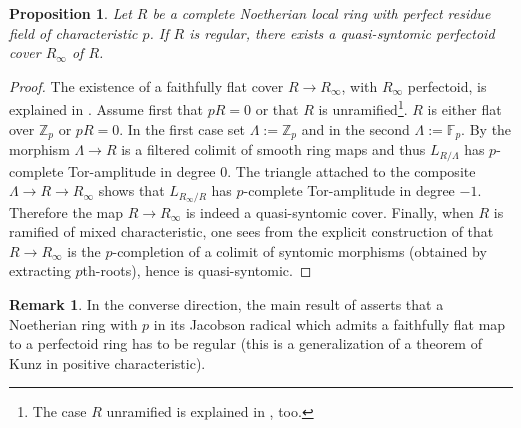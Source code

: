 \documentclass{amsart}
\theoremstyle{plain}
\newtheorem{proposition}[theorem]{Proposition}
\theoremstyle{definition}
\newtheorem{remark}[theorem]{Remark}
\newcommand{\F}{\mathbb{F}}
\newcommand{\Z}{\mathbb{Z}}
\newcommand{\blue}[1]{{\color{black}#1}}
\begin{document}
\begin{proposition}
\label{sec:comp-regular-perfectoid-cover}
Let $R$ be a \blue{complete Noetherian local ring with perfect residue field of characteristic $p$}. If $R$ is regular, there exists a quasi-syntomic perfectoid cover $R_{\infty}$ of $R$. 
\end{proposition}
\begin{proof}
  The existence of a faithfully flat cover $R \to R_{\infty}$, with $R_{\infty}$ perfectoid, is explained in \cite[Theorem 4.7]{bhatt_iyengar_ma_regular_rings_and_perfectoid_algebras}. Assume first that $pR=0$ or that $R$ is unramified\footnote{The case $R$ unramified is explained in \cite[Ex. 3.8 (4)]{bhatt_iyengar_ma_regular_rings_and_perfectoid_algebras}, too.}.  $R$ is either flat over $\Z_p$ or $pR=0$. In the first case set $\Lambda:=\Z_p$ and in the second $\Lambda:=\F_p$. By \cite[Tag 07GB]{stacks_project} the morphism $\Lambda\to R$ is a filtered colimit of smooth ring maps and thus $L_{R/\Lambda}$ has $p$-complete Tor-amplitude in degree $0$. The triangle attached to the composite $\Lambda \to R \to R_{\infty}$ shows that $L_{R_{\infty}/R}$ has $p$-complete Tor-amplitude in degree $-1$. Therefore the map $R \to R_{\infty}$ is indeed a quasi-syntomic cover. Finally, when $R$ is ramified of mixed characteristic, one sees from the explicit construction of \cite[Ex. 3.8 (5)]{bhatt_iyengar_ma_regular_rings_and_perfectoid_algebras} that $R \to R_{\infty}$ is the $p$-completion of a colimit of syntomic morphisms (obtained by extracting $p$th-roots), hence is quasi-syntomic. 
\end{proof}


\begin{remark}
In the converse direction, the main result of \cite{bhatt_iyengar_ma_regular_rings_and_perfectoid_algebras} asserts that a Noetherian ring with $p$ in its Jacobson radical which admits a faithfully flat map to a perfectoid ring has to be regular (this is a generalization of a theorem of Kunz \cite{kunz_characterizations_of_regular_local_rings_of_characteristic_p} in positive characteristic).
\end{remark}
\end{document}
